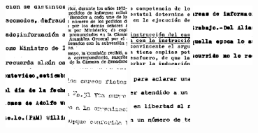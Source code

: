\documentclass[11pt,a4paper]{article}
\begin{document}
\begin{figure}
\centering%
\includegraphics[width=0.2\textwidth]{r0566_0019.jpg}%
\includegraphics[width=0.2\textwidth]{r0566_0689.jpg}%
\includegraphics[width=0.2\textwidth]{r0566_0949.jpg}%
\includegraphics[width=0.2\textwidth]{r0566_0037.jpg}\\
\centering%
\includegraphics[width=0.2\textwidth]{r0566_0038.jpg}%
\includegraphics[width=0.2\textwidth]{r0566_0064.jpg}%
\includegraphics[width=0.2\textwidth]{r0566_0080.jpg}%

\end{figure}
\end{document}
